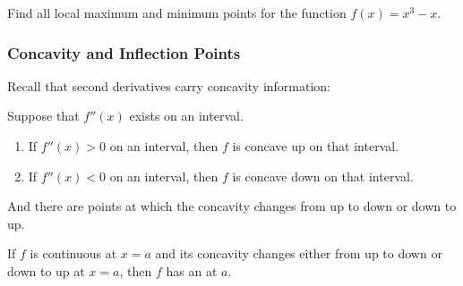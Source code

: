\documentclass[10pt,t,handout,ignorenonframetext,aspectratio=169]{beamer}
\begin{document}
\begin{frame}
  \vs
  \begin{question}
    Find all local maximum and minimum points for the function
    $f(x)=x^3-x$.
  \end{question}
\end{frame}

\begin{frame}
  \frametitle{Concavity and Inflection Points}
  Recall that second derivatives carry concavity information:
  \begin{thm}
    Suppose that $f''(x)$ exists on an interval.
    \begin{enumerate}
    \item If $f''(x)>0$ on an interval, then $f$ is concave up on that interval.
    \item If $f''(x)<0$ on an interval, then $f$ is concave down on that interval.
    \end{enumerate}
  \end{thm}

  And there are points at which the concavity changes from up to down or down to up.

  \begin{defn}
    If \(f\) is continuous at \(x=a\) and its concavity changes either from up to down
    or down to up at \(x=a\), then \(f\) has an  at
    \(a\).
  \end{defn}
\end{frame}
\end{document}
